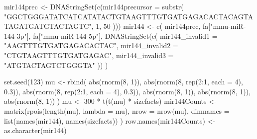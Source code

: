 \documentclass[12pt,twoside]{reedthesis}
\newenvironment{Shaded}{\begin{snugshade}}{\end{snugshade}}
\newcommand{\AttributeTok}[1]{\textcolor[rgb]{0.77,0.63,0.00}{#1}}
\newcommand{\DecValTok}[1]{\textcolor[rgb]{0.00,0.00,0.81}{#1}}
\newcommand{\FloatTok}[1]{\textcolor[rgb]{0.00,0.00,0.81}{#1}}
\newcommand{\FunctionTok}[1]{\textcolor[rgb]{0.00,0.00,0.00}{#1}}
\newcommand{\NormalTok}[1]{#1}
\newcommand{\OtherTok}[1]{\textcolor[rgb]{0.56,0.35,0.01}{#1}}
\newcommand{\SpecialCharTok}[1]{\textcolor[rgb]{0.00,0.00,0.00}{#1}}
\newcommand{\StringTok}[1]{\textcolor[rgb]{0.31,0.60,0.02}{#1}}
\begin{document}
\begin{Shaded}
\begin{Highlighting}[]
\NormalTok{mir144prec }\OtherTok{\textless{}{-}} \FunctionTok{DNAStringSet}\NormalTok{(}\FunctionTok{c}\NormalTok{(}\AttributeTok{mir144precursor =} \FunctionTok{substr}\NormalTok{(}
  \StringTok{"GGCTGGGATATCATCATATACTGTAAGTTTGTGATGAGACACTACAGTATAGATGATGTACTAGTC"}\NormalTok{,}
  \DecValTok{1}\NormalTok{, }\DecValTok{50}
\NormalTok{)))}
\NormalTok{mir144 }\OtherTok{\textless{}{-}} \FunctionTok{c}\NormalTok{(}
\NormalTok{  mir144prec, fa[}\StringTok{"mmu{-}miR{-}144{-}3p"}\NormalTok{], fa[}\StringTok{"mmu{-}miR{-}144{-}5p"}\NormalTok{],}
  \FunctionTok{DNAStringSet}\NormalTok{(}\FunctionTok{c}\NormalTok{(}
    \AttributeTok{mir144\_invalid1 =} \StringTok{"AAGTTTGTGATGAGACACTAC"}\NormalTok{,}
    \AttributeTok{mir144\_invalid2 =} \StringTok{"CTGTAAGTTTGTGATGAGAC"}\NormalTok{,}
    \AttributeTok{mir144\_invalid3 =} \StringTok{"ATGTACTAGTCTGGGTA"}
\NormalTok{  ))}
\NormalTok{)}

\FunctionTok{set.seed}\NormalTok{(}\DecValTok{123}\NormalTok{)}
\NormalTok{mu }\OtherTok{\textless{}{-}} \FunctionTok{rbind}\NormalTok{(}
  \FunctionTok{abs}\NormalTok{(}\FunctionTok{rnorm}\NormalTok{(}\DecValTok{8}\NormalTok{, }\DecValTok{1}\NormalTok{)),}
  \FunctionTok{abs}\NormalTok{(}\FunctionTok{rnorm}\NormalTok{(}\DecValTok{8}\NormalTok{, }\FunctionTok{rep}\NormalTok{(}\DecValTok{2}\SpecialCharTok{:}\DecValTok{1}\NormalTok{, }\AttributeTok{each =} \DecValTok{4}\NormalTok{), }\FloatTok{0.3}\NormalTok{)),}
  \FunctionTok{abs}\NormalTok{(}\FunctionTok{rnorm}\NormalTok{(}\DecValTok{8}\NormalTok{, }\FunctionTok{rep}\NormalTok{(}\DecValTok{2}\SpecialCharTok{:}\DecValTok{1}\NormalTok{, }\AttributeTok{each =} \DecValTok{4}\NormalTok{), }\FloatTok{0.3}\NormalTok{)),}
  \FunctionTok{abs}\NormalTok{(}\FunctionTok{rnorm}\NormalTok{(}\DecValTok{8}\NormalTok{, }\DecValTok{1}\NormalTok{)), }\FunctionTok{abs}\NormalTok{(}\FunctionTok{rnorm}\NormalTok{(}\DecValTok{8}\NormalTok{, }\DecValTok{1}\NormalTok{)), }\FunctionTok{abs}\NormalTok{(}\FunctionTok{rnorm}\NormalTok{(}\DecValTok{8}\NormalTok{, }\DecValTok{1}\NormalTok{))}
\NormalTok{)}
\NormalTok{mu }\OtherTok{\textless{}{-}} \DecValTok{300} \SpecialCharTok{*} \FunctionTok{t}\NormalTok{(}\FunctionTok{t}\NormalTok{(mu) }\SpecialCharTok{*}\NormalTok{ sizefacts)}
\NormalTok{mir144Counts }\OtherTok{\textless{}{-}} \FunctionTok{matrix}\NormalTok{(}\FunctionTok{rpois}\NormalTok{(}\FunctionTok{length}\NormalTok{(mu), }\AttributeTok{lambda =}\NormalTok{ mu),}
  \AttributeTok{nrow =} \FunctionTok{nrow}\NormalTok{(mu),}
  \AttributeTok{dimnames =} \FunctionTok{list}\NormalTok{(}\FunctionTok{names}\NormalTok{(mir144), }\FunctionTok{names}\NormalTok{(sizefacts))}
\NormalTok{)}
\FunctionTok{row.names}\NormalTok{(mir144Counts) }\OtherTok{\textless{}{-}} \FunctionTok{as.character}\NormalTok{(mir144)}
\end{Highlighting}
\end{Shaded}
\end{document}
